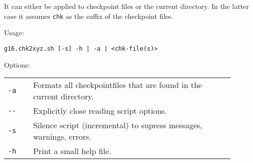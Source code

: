 \documentclass[   %
  final,          %
  a4paper         %
]{article}
\begin{document}
It can either be applied to checkpoint files or the current directory.
In the latter case it assumes \texttt{chk} as the suffix of the checkpoint files.

Usage: 

\lstinline`g16.chk2xyz.sh [-s] -h | -a | <chk-file(s)>`

Options:

\begin{tabular}{p{0.1\linewidth}p{0.8\linewidth}}
  {\lstinline`-a`}       & Formats all checkpointfiles that are found in the current directory. \\
  {\lstinline`--`}       & Explicitly close reading script options. \\
  {\lstinline`-s`}       & Silence script (incremental) to supress messages, warnings, errors. \\
  {\lstinline`-h`}       & Print a small help file. \\
\end{tabular}
\end{document}
